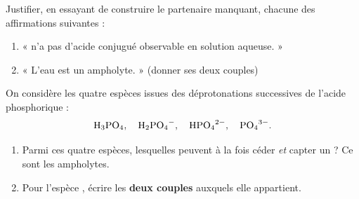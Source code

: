 \documentclass[11pt,a4paper]{article}
\begin{document}
\begin{exobox}
Justifier, en essayant de construire le partenaire manquant, chacune des affirmations suivantes :
\begin{enumerate}[label=\alph*),leftmargin=1.6em,itemsep=2pt]
  \item «  n'a pas d'acide conjugué observable en solution aqueuse. »
  \item « L'eau  est un ampholyte. » (donner ses deux couples)
\end{enumerate}
\end{exobox}

\begin{exobox}
On considère les quatre espèces issues des déprotonations successives de l'acide phosphorique :
\[ \ce{H3PO4},\quad \ce{H2PO4-},\quad \ce{HPO4^{2-}},\quad \ce{PO4^{3-}}. \]
\begin{enumerate}[label=\alph*),leftmargin=1.6em,itemsep=2pt]
  \item Parmi ces quatre espèces, lesquelles peuvent à la fois céder \emph{et} capter un  ? Ce sont les
        ampholytes.
  \item Pour l'espèce , écrire les \textbf{deux couples} auxquels elle appartient.
\end{enumerate}
\end{exobox}
\end{document}
